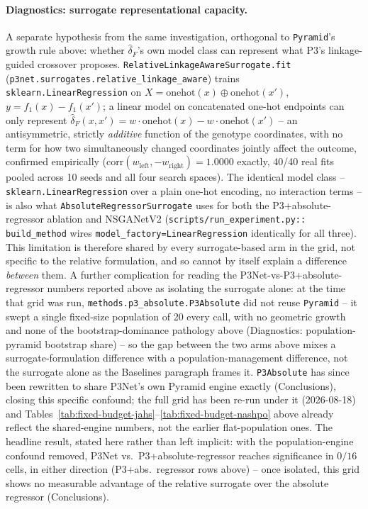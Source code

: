 \paragraph{Diagnostics: surrogate representational capacity.} A separate hypothesis from the same
investigation, orthogonal to \texttt{Pyramid}'s growth rule above: whether $\hat{\delta}_F$'s own model class
can represent what P3's linkage-guided crossover proposes. \texttt{RelativeLinkageAwareSurrogate.fit}
(\texttt{p3net.surrogates.relative\_linkage\_aware}) trains \texttt{sklearn.LinearRegression} on
$X = \mathrm{onehot}(x) \oplus \mathrm{onehot}(x')$, $y = f_1(x) - f_1(x')$; a linear model on concatenated
one-hot endpoints can only represent $\hat{\delta}_F(x,x') = w \cdot \mathrm{onehot}(x) - w \cdot
\mathrm{onehot}(x')$ -- an antisymmetric, strictly \emph{additive} function of the genotype coordinates,
with no term for how two simultaneously changed coordinates jointly affect the outcome, confirmed
empirically ($\mathrm{corr}(w_{\text{left}}, -w_{\text{right}}) = 1.0000$ exactly, 40/40 real fits pooled
across 10 seeds and all four search spaces). The identical model class -- \texttt{sklearn.LinearRegression}
over a plain one-hot encoding, no interaction terms -- is also what \texttt{AbsoluteRegressorSurrogate} uses
for both the P3+absolute-regressor ablation and NSGANetV2 (\texttt{scripts/run\_experiment.py::
build\_method} wires \texttt{model\_factory=LinearRegression} identically for all three). This limitation is
therefore shared by every surrogate-based arm in the grid, not specific to the relative formulation, and so
cannot by itself explain a difference \emph{between} them. A further complication for reading the
P3Net-vs-P3+absolute-regressor numbers reported above as isolating the surrogate alone: at the time that grid
was run, \texttt{methods.p3\_absolute.P3Absolute} did not reuse \texttt{Pyramid} -- it swept a single
fixed-size population of 20 every call, with no geometric growth and none of the bootstrap-dominance
pathology above (Diagnostics: population-pyramid bootstrap share) -- so the gap between the two arms above
mixes a surrogate-formulation difference with a population-management difference, not the surrogate alone as
the Baselines paragraph frames it. \texttt{P3Absolute} has since been rewritten to share P3Net's own Pyramid
engine exactly (Conclusions), closing this specific confound; the full grid has been re-run under it
(2026-08-18) and Tables~\ref{tab:fixed-budget-jahs}--\ref{tab:fixed-budget-nashpo} above already reflect the
shared-engine numbers, not the earlier flat-population ones. The headline result, stated here rather than
left implicit: with the population-engine confound removed, P3Net vs.\ P3+absolute-regressor reaches
significance in $0/16$ cells, in either direction (P3+abs.\ regressor rows above) -- once isolated, this grid
shows no measurable advantage of the relative surrogate over the absolute regressor (Conclusions).

